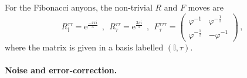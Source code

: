 \documentclass[aps, prl, letterpaper, twocolumn, superscriptaddress, notitlepage, 10pt]{revtex4}
\newcommand{\e}{\mathrm{e}}
\newcommand{\vac}{\mathbb{I}}
\begin{document}

For the Fibonacci anyons, the non-trivial $R$ and $F$ moves are 
\begin{equation*}
	R_{\vac}^{\tau\tau} = \e^{\frac{-4\pi i}{5}} 
	\ \ , \ \
	R_\tau^{\tau\tau}= \e^{\frac{3\pi i}{5}} 
	\ \ , \ \
	F_{\tau}^{\tau\tau\tau} = \begin{pmatrix}\varphi^{-1}&\varphi^{-\frac{1}{2}}\\\varphi^{-\frac{1}{2}}&-\varphi^{-1}\end{pmatrix} \,,
\end{equation*}
where the matrix is given in a basis labelled $(\vac,\tau)$.


\paragraph{Noise and error-correction.}
\end{document}
